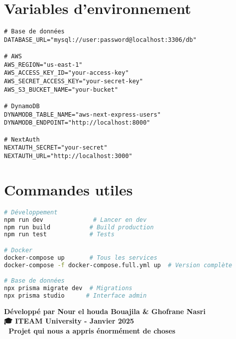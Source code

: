 \documentclass[12pt,a4paper]{report}
\begin{document}
\chapter{Variables d'environnement}

\begin{lstlisting}[caption=Configuration environnement]
# Base de données
DATABASE_URL="mysql://user:password@localhost:3306/db"

# AWS
AWS_REGION="us-east-1"
AWS_ACCESS_KEY_ID="your-access-key"
AWS_SECRET_ACCESS_KEY="your-secret-key"
AWS_S3_BUCKET_NAME="your-bucket"

# DynamoDB
DYNAMODB_TABLE_NAME="aws-next-express-users"
DYNAMODB_ENDPOINT="http://localhost:8000"

# NextAuth
NEXTAUTH_SECRET="your-secret"
NEXTAUTH_URL="http://localhost:3000"
\end{lstlisting}

\chapter{Commandes utiles}

\begin{lstlisting}[language=bash, caption=Commandes de développement]
# Développement
npm run dev              # Lancer en dev
npm run build           # Build production
npm run test            # Tests

# Docker
docker-compose up       # Tous les services
docker-compose -f docker-compose.full.yml up  # Version complète

# Base de données
npx prisma migrate dev  # Migrations
npx prisma studio      # Interface admin
\end{lstlisting}

\vfill

\begin{center}
\textbf{Développé par Nour el houda Bouajila \& Ghofrane Nasri}\\
\textbf{🎓 ITEAM University - Janvier 2025}\\
\textbf{🚀 Projet qui nous a appris énormément de choses}
\end{center}
\end{document}
